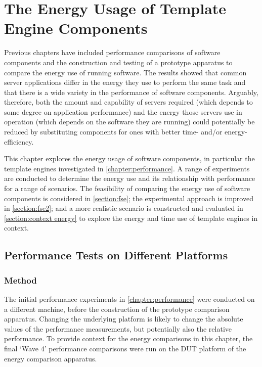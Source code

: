\chapter{The Energy Usage of Template Engine Components}
\label{chapter:comp energy}

Previous chapters have included performance comparisons of software components and the construction and testing of a prototype apparatus to compare the energy use of running software. The results showed that common server applications differ in the energy they use to perform the same task and that there is a wide variety in the performance of software components. Arguably, therefore, both the amount and capability of servers required (which depends to some degree on application performance) and the energy those servers use in operation (which depends on the software they are running) could potentially be reduced by substituting components for ones with better time- and/or energy-efficiency.

This chapter explores the energy usage of software components, in particular the template engines investigated in \autoref{chapter:performance}. A range of experiments are conducted to determine the energy use and its relationship with performance for a range of scenarios. The feasibility of comparing the energy use of software components is considered in \autoref{section:fse}; the experimental approach is improved in \autoref{section:fse2}; and a more realistic scenario is constructed and evaluated in \autoref{section:context energy} to explore the energy and time use of template engines in context.

\section{Performance Tests on Different Platforms}
\label{section:perf dut}

\subsection{Method}

The initial performance experiments in \autoref{chapter:performance} were conducted on a different machine, before the construction of the prototype comparison apparatus. Changing the underlying platform is likely to change the absolute values of the performance measurements, but potentially also the relative performance. To provide context for the energy comparisons in this chapter, the final `Wave 4' performance comparisons were run on the DUT platform of the energy comparison apparatus.

